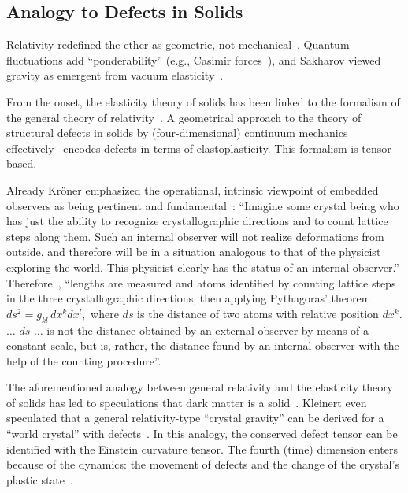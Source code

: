\documentclass[%
  reprint,
  superscriptaddress,
  showpacs,
  showkeys,
  amsmath,amssymb,
  pra,
  longbibliography,
  floatfix,
  x11names
]{revtex4-2}
\begin{document}
\subsection{Analogy to Defects in Solids}

Relativity redefined the ether as geometric, not mechanical~\cite{einstein-aether-en}. Quantum fluctuations add ``ponderability'' (e.g., Casimir forces~\cite{Casimir_1948}), and Sakharov viewed gravity as emergent from vacuum elasticity~\cite{Sakharov-67}.

From the onset, the elasticity theory of solids has been linked to the formalism of the general theory of relativity~\cite{schaefer-1953,zaanen-2022}. A geometrical approach to the theory of structural defects in solids by (four-dimensional) continuum mechanics~\cite{Kroner-1958,kroner-1959,Kosevich-1962,Turski-66,kroner-1967,kroner-1975,Kossecka_deWit-77,kroner-1985,kroner-1990,kroner-2001,amari-1968,gunther-1972,Guenther-1979,gunther-1981,gunther-1983,golebiewska-lasota-1979a,golebiewska-lasota-1979b}
effectively~\cite{anderson:73} encodes defects in terms of elastoplasticity.
This formalism is tensor based.

Already Kr\"oner emphasized the
operational, intrinsic viewpoint of embedded observers as being pertinent and fundamental~\cite{kroner-1990}:
``Imagine some crystal being who has just the ability to recognize
crystallographic directions and to count lattice steps along them. Such an
internal observer will not realize deformations from outside, and therefore
will be in a situation analogous to that of the physicist exploring the world.
This physicist clearly has the status of an internal observer.''
Therefore~\cite{kroner-1985}, ``lengths are measured and atoms identified by
counting lattice steps in the three crystallographic directions, then applying Pythagoras' theorem
$
ds^2 = g_{kl}\, dx^k dx^l,
$
where $ds$ is the distance of two atoms with relative position $dx^k$.
$\ldots$
$ds$ $\ldots$ is not the distance obtained by
an external observer by means of a constant scale, but is, rather, the distance found
by an internal observer with the help of the counting procedure''.

The aforementioned analogy between general relativity and the elasticity theory of solids
has led to speculations that dark matter is a solid~\cite{Bucher-PhysRevD.60.043505}.
Kleinert even speculated that a general relativity-type ``crystal gravity'' can be derived for a ``world crystal'' with defects~\cite{kleinert-1987,kleinert-2000,kroner-2001,kleinert-2004}.
In this analogy, the conserved defect tensor can be identified with the Einstein curvature tensor.
The fourth (time) dimension enters because of the dynamics: the movement of defects and the change of the crystal's plastic state~\cite{amari-1968}.
\end{document}
